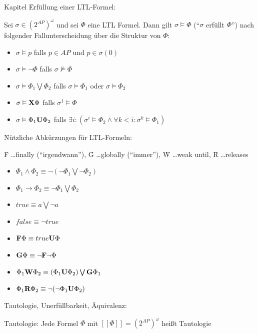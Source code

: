 \begin{chapter}{Kapitel}
\f{Erfüllung einer LTL-Formel}:
\vspace*{5pt}

\noindent Sei $\sigma \in (2^{AP})^\omega$ und sei $\Phi$ eine LTL Formel. Dann gilt $\sigma \vDash \Phi$ (``$\sigma$ erfüllt $\Phi$'') nach folgender
Fallunterscheidung über die Struktur von $\Phi$:
\begin{itemize}
 \item $\sigma \vDash p$ \qquad \qquad   falls $p\in AP$ und $p\in\sigma(0)$
 \item $\sigma \vDash \neg\Phi$ \qquad  \qquad falls $\sigma \nvDash \Phi$
 \item $\sigma \vDash \Phi_1 \bigvee \Phi_2$ \qquad falls $\sigma \vDash \Phi_1$ oder $\sigma \vDash \Phi_2$
 \item $\sigma \vDash \f{X}\Phi$ \qquad  \qquad falls $\sigma^1 \vDash \Phi $
 \item $\sigma \vDash \Phi_1\f{U}\Phi_2$ \qquad falls $\exists i: \left(\sigma^i\vDash \Phi_2 \wedge \forall k < i:\sigma^k \vDash \Phi_1 \right)$
\end{itemize}
\vspace*{5pt}

\f{Nützliche Abkürzungen für LTL-Formeln}:
\vspace*{4pt}

\f{F} \dots finally (``irgendwann''), \f{G} \dots globally (``immer''), \f{W} \dots weak until, \f{R} \dots releases
\begin{itemize}
 \item $\Phi_1\wedge\Phi_2 \equiv \neg(\neg\Phi_1\bigvee\neg\Phi_2)$
 \item $\Phi_1 \rightarrow \Phi_2 \equiv \neg\Phi_1\bigvee\Phi_2$
 \item $true \equiv a\bigvee\neg a$
 \item $false \equiv \neg true$
 \item $\f{F}\Phi \equiv true\f{U}\Phi$
 \item $\f{G}\Phi \equiv \neg\f{F}\neg\Phi$
 \item $\Phi_1\f{W}\Phi_2 \equiv (\Phi_1\f{U}\Phi_2)\bigvee\f{G}\Phi_1$
 \item $\Phi_1\f{R}\Phi_2 \equiv \neg(\neg\Phi_1\f{U}\Phi_2)$
\end{itemize}
\vspace*{5pt}

\f{Tautologie, Unerfüllbarkeit, Äquivalenz}:
\vspace*{4pt}

\f{Tautologie}: Jede Formel $\Phi$ mit $[[\Phi]] = \left(2^{AP}\right)^\omega$ heißt Tautologie
\vspace*{4pt}


\end{chapter}
